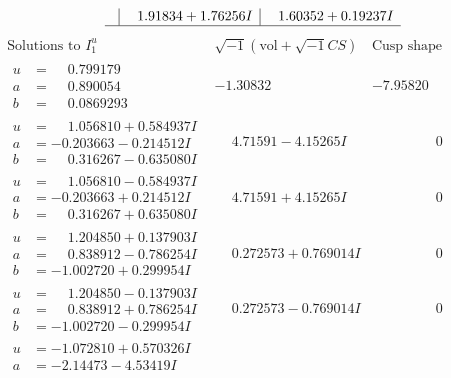 \documentclass[1p]{elsarticle_modified}
\theoremstyle{definition}
\newcommand{\I}{\sqrt{-1}}
\begin{document}
$$\begin{array}{c|c|c}
 & \phantom{-}1.91834 + 1.76256 I & \phantom{-}1.60352 + 0.19237 I\\
 \hline 
 \end{array}$$\newpage$$\begin{array}{c|c|c}  
\text{Solutions to }I^u_{1}& \I (\text{vol} + \sqrt{-1}CS) & \text{Cusp shape}\\
 \hline 
\begin{aligned}
u &= \phantom{-}0.799179\phantom{ +0.000000I} \\
a &= \phantom{-}0.890054\phantom{ +0.000000I} \\
b &= \phantom{-}0.0869293\phantom{ +0.000000I}\end{aligned}
 & -1.30832\phantom{ +0.000000I} & -7.95820\phantom{ +0.000000I} \\ \hline\begin{aligned}
u &= \phantom{-}1.056810 + 0.584937 I \\
a &= -0.203663 - 0.214512 I \\
b &= \phantom{-}0.316267 - 0.635080 I\end{aligned}
 & \phantom{-}4.71591 - 4.15265 I & \phantom{-0.000000 } 0 \\ \hline\begin{aligned}
u &= \phantom{-}1.056810 - 0.584937 I \\
a &= -0.203663 + 0.214512 I \\
b &= \phantom{-}0.316267 + 0.635080 I\end{aligned}
 & \phantom{-}4.71591 + 4.15265 I & \phantom{-0.000000 } 0 \\ \hline\begin{aligned}
u &= \phantom{-}1.204850 + 0.137903 I \\
a &= \phantom{-}0.838912 - 0.786254 I \\
b &= -1.002720 + 0.299954 I\end{aligned}
 & \phantom{-}0.272573 + 0.769014 I & \phantom{-0.000000 } 0 \\ \hline\begin{aligned}
u &= \phantom{-}1.204850 - 0.137903 I \\
a &= \phantom{-}0.838912 + 0.786254 I \\
b &= -1.002720 - 0.299954 I\end{aligned}
 & \phantom{-}0.272573 - 0.769014 I & \phantom{-0.000000 } 0 \\ \hline\begin{aligned}
u &= -1.072810 + 0.570326 I \\
a &= -2.14473 - 4.53419 I \\

\end{aligned}
\end{array}$$
\end{document}
